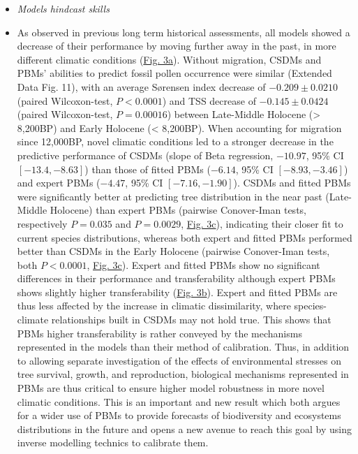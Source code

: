 \documentclass[pdflatex, sn-nature]{sn-jnl}%
\begin{document}
\renewcommand\labelitemi{{\boldmath$\cdot$}}
\begin{itemize}
\setlength\itemsep{1em}
\item \emph{Models hindcast skills}\par
\item As observed in previous long term historical assessments, all models showed a decrease of their performance by moving further away in the past, in more different climatic conditions (\hyperref[past_performance]{Fig. 3a}).
Without migration, CSDMs and PBMs' abilities to predict fossil pollen occurrence were similar (Extended Data Fig. 11), with an average Sørensen index decrease of $-0.209\pm0.0210$ (paired Wilcoxon-test, $P<0.0001$) and TSS decrease of $-0.145\pm0.0424$ (paired Wilcoxon-test, $P=0.00016$) between Late-Middle Holocene (> 8,200BP) and Early Holocene (< 8,200BP).  When accounting for migration since 12,000BP, novel climatic conditions led to a stronger decrease in the predictive performance of CSDMs (slope of Beta regression, $-10.97$, 95\% CI $[-13.4, -8.63]$) than those of fitted PBMs ($-6.14$, 95\% CI $[-8.93, -3.46]$) and expert PBMs ($-4.47$, 95\% CI $[-7.16, -1.90]$). CSDMs and fitted PBMs were significantly better at predicting tree distribution in the near past (Late-Middle Holocene) than expert PBMs (pairwise Conover-Iman tests, respectively $P=0.035$ and $P=0.0029$, \hyperref[past_performance]{Fig. 3c}), indicating their closer fit to current species distributions, whereas both expert and fitted PBMs performed better than CSDMs in the Early Holocene (pairwise Conover-Iman tests, both $P<0.0001$, \hyperref[past_performance]{Fig. 3c}). 
Expert and fitted PBMs show no significant differences in their performance and transferability although expert PBMs shows slightly higher transferability  (\hyperref[past_performance]{Fig. 3b}). Expert and fitted PBMs are thus less affected by the increase in climatic dissimilarity, where species-climate relationships built in CSDMs may not hold true. %
This shows that PBMs higher transferability is rather conveyed by the mechanisms represented in the models than their method of calibration. Thus, in addition to allowing separate investigation of the effects of environmental stresses on tree survival, growth, and reproduction, biological mechanisms represented in PBMs are thus critical to ensure higher model robustness in more novel climatic conditions. This is an important and new result which both argues for a wider use of PBMs to provide forecasts of biodiversity and ecosystems distributions in the future and opens a new avenue  to reach this goal by using inverse modelling technics to calibrate them. 

\end{itemize}
\end{document}

